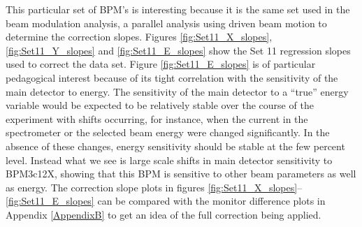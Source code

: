 This particular set of BPM's is interesting because it is the same set used in the beam modulation analysis, a parallel analysis using driven beam motion to determine the correction slopes. Figures \ref{fig:Set11_X_slopes}, \ref{fig:Set11_Y_slopes}  and \ref{fig:Set11_E_slopes}  show the Set 11 regression slopes used to correct the \Qs data set. Figure  \ref{fig:Set11_E_slopes} is of particular pedagogical interest because of its tight correlation with the sensitivity of the main detector to energy. The sensitivity of the main detector to a ``true'' energy variable would be expected to be relatively stable over the course of the experiment with shifts occurring, for instance, when the current in the \qtor spectrometer or the selected beam energy were changed significantly. In the absence of these changes, energy sensitivity should be stable at the few percent level. Instead what we see is large scale shifts in main detector sensitivity to BPM3c12X, showing that this BPM is sensitive to other beam parameters as well as energy. 
The correction slope plots in figures \ref{fig:Set11_X_slopes}--\ref{fig:Set11_E_slopes} can be compared with the monitor difference plots in Appendix \ref{AppendixB} to get an idea of the full correction being applied. 



